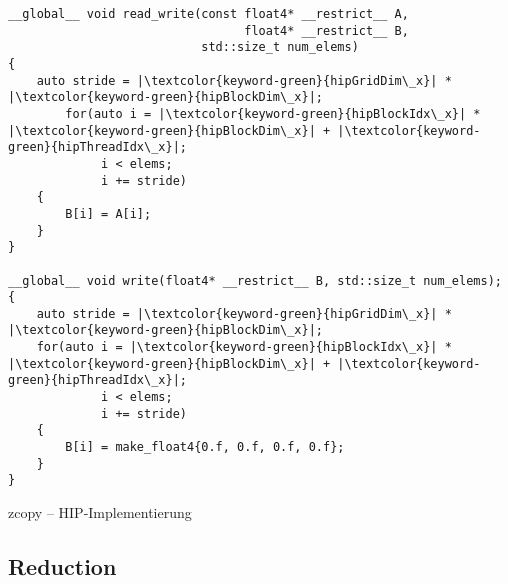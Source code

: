 \begin{code}
    \begin{verbatim}
__global__ void read_write(const float4* __restrict__ A,
                                 float4* __restrict__ B,
                           std::size_t num_elems)
{
    auto stride = |\textcolor{keyword-green}{hipGridDim\_x}| * |\textcolor{keyword-green}{hipBlockDim\_x}|;
        for(auto i = |\textcolor{keyword-green}{hipBlockIdx\_x}| * |\textcolor{keyword-green}{hipBlockDim\_x}| + |\textcolor{keyword-green}{hipThreadIdx\_x}|;
             i < elems;
             i += stride)
    {
        B[i] = A[i];
    }
}

__global__ void write(float4* __restrict__ B, std::size_t num_elems);
{
    auto stride = |\textcolor{keyword-green}{hipGridDim\_x}| * |\textcolor{keyword-green}{hipBlockDim\_x}|;
    for(auto i = |\textcolor{keyword-green}{hipBlockIdx\_x}| * |\textcolor{keyword-green}{hipBlockDim\_x}| + |\textcolor{keyword-green}{hipThreadIdx\_x}|;
             i < elems;
             i += stride)
    {
        B[i] = make_float4{0.f, 0.f, 0.f, 0.f};
    }
}
    \end{verbatim}
    \caption{zcopy -- HIP-Implementierung}
    \label{anhang:hip:zcopy}
\end{code}

\subsection{Reduction}

